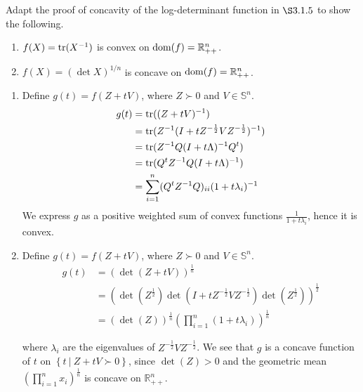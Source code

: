 \begin{problem}[3.18]
    Adapt the proof of concavity of the log-determinant function in $\S 3.1.5$ to show the following.
    \begin{enumerate}
        \item $f(X) = \operatorname{tr}(X^{-1})$ is convex on $\operatorname{dom}(f) = \mathbb{R}^n_{++}$.
        \item $f(X) = (\operatorname{det} X)^{1 / n}$ is concave on $\operatorname{dom}(f) = \mathbb{R}^n_{++}$.
    \end{enumerate}

    \Answer \text{}
    \begin{enumerate}
        \item Define $g(t) = f(Z + tV)$, where $Z \succ 0$ and $V \in \mathbb{S}^n$. \begin{align*}
            g(t) &= \operatorname{tr}((Z + tV)^{-1})\\
            &= \operatorname{tr}(Z^{-1}(I + tZ^{-\frac{1}{2}}VZ^{-\frac{1}{2}})^{-1})\\
            &= \operatorname{tr}(Z^{-1} Q (I + t\Lambda)^{-1} Q^t)\\
            &= \operatorname{tr}(Q^tZ^{-1}Q(I + t\Lambda)^{-1})\\
            &= \sum_{i = 1}^n(Q^tZ^{-1}Q)_{ii}(1 + t\lambda_i)^{-1}
        \end{align*}
        We express $g$ as a positive weighted sum of convex functions $\frac{1}{1 + t\lambda_i}$, hence it is convex.
        \item Define $g(t) = f(Z + tV)$, where $Z \succ 0$ and $V \in \mathbb{S}^n$. \begin{align*}
            g(t) &= (\det(Z + tV))^{\frac{1}{n}}\\
            &= (\det(Z^{\frac{1}{2}}) \det(I + tZ^{-\frac{1}{2}}VZ^{-\frac{1}{2}}) \det(Z^{\frac{1}{2}}))^{\frac{1}{2}}\\ 
            &= (\det(Z))^{\frac{1}{n}}\left(\prod_{i = 1}^n(1 + t\lambda_i)\right)^{\frac{1}{n}}
        \end{align*}

        where $\lambda_i$ are the eigenvalues of $Z^{-\frac{1}{2}} V Z^{-\frac{1}{2}}$. We see that $g$ is a concave function of $t$ on $\left\{t \ | \ Z + tV \succ 0\right\}$, since $\det(Z) > 0$ and the geometric mean $(\prod_{i = 1}^nx_i)^{\frac{1}{n}}$ is concave on $\mathbb{R}_{++}^n$.
    \end{enumerate}
\end{problem}


